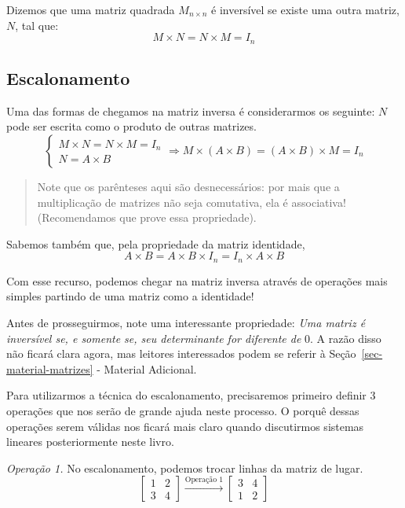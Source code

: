 \documentclass[
  portuguese,
  letterpaper,
  DIV=11,
  numbers=noendperiod]{scrreport}
\begin{document}
Dizemos que uma matriz quadrada \(M_{n\times n}\) é inversível se existe
uma outra matriz, \(N\), tal que: \[
    M\times N = N \times M = I_n
\]

\subsection{Escalonamento}\label{escalonamento}

Uma das formas de chegamos na matriz inversa é considerarmos os
seguinte: \(N\) pode ser escrita como o produto de outras matrizes. \[
\begin{cases}
    M \times N = N \times M = I_{n} \\
    N = {A \times B}
\end{cases}\Rightarrow M \times (A \times B) = (A\times B) \times M = I_n 
\]

\begin{quote}
Note que os parênteses aqui são desnecessários: por mais que a
multiplicação de matrizes não seja comutativa, ela é associativa!
(Recomendamos que prove essa propriedade).
\end{quote}

Sabemos também que, pela propriedade da matriz identidade, \[
A \times B = A \times B \times I_n = I_n \times A \times B
\]

Com esse recurso, podemos chegar na matriz inversa através de operações
mais simples partindo de uma matriz como a identidade!

Antes de prosseguirmos, note uma interessante propriedade: \emph{Uma
matriz é inversível se, e somente se, seu determinante for diferente de}
\(0\). A razão disso não ficará clara agora, mas leitores interessados
podem se referir à Seção~\ref{sec-material-matrizes} - Material
Adicional.

Para utilizarmos a técnica do escalonamento, precisaremos primeiro
definir 3 operações que nos serão de grande ajuda neste processo. O
porquê dessas operações serem válidas nos ficará mais claro quando
discutirmos sistemas lineares posteriormente neste livro.

\emph{Operação 1.} No escalonamento, podemos trocar linhas da matriz de
lugar. \[
\begin{bmatrix}
    1 & 2 \\
    3 & 4
\end{bmatrix} \stackrel{\text{Operação 1}}{\rightarrow}
\begin{bmatrix}
    3 & 4 \\
    1 & 2
\end{bmatrix}
\]
\end{document}
